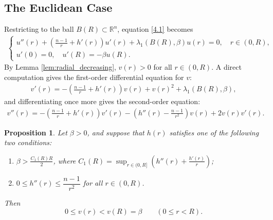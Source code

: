 \documentclass[11pt,leqno]{amsart}
\newtheorem{prop}{Proposition}[section]
\def\R{\mathbb{R}}
\numberwithin{equation}{section}
\begin{document}
\subsection{The Euclidean Case}
Restricting to the ball $B(R)\subset\R^n$, equation \eqref{4.1} becomes
\begin{align}\label{1 dimen eigen R}
    \begin{cases}
   u''(r)+\left(\frac{n-1}{r}+h'(r)\right)u'(r)+\lambda_1(B(R), \beta) u(r)=0, \quad r\in (0, R),\\
   u'(0)=0, \quad u'(R)=-\beta u(R).
\end{cases}
\end{align}
 By Lemma \ref{lem:radial_decreasing}, $v(r) > 0$ for all $r\in (0,R)$. 
A direct computation gives the first-order differential equation for $v$:
\begin{align}\label{v first derivative}
    v'(r) = -\left(\frac{n-1}{r}+h'(r)\right)v(r) + v(r)^{2} + \lambda_1(B(R), \beta),
\end{align}
and differentiating once more gives the second-order equation:
\begin{align}\label{v second derivative}
    v''(r) = -\left(\frac{n-1}{r}+h'(r)\right)v'(r) - \left(h''(r)-\frac{n-1}{r^{2}}\right)v(r) + 2v(r)v'(r).
\end{align}

\begin{prop}\label{prop:Euclidean_v_max}
Let $\beta > 0$, and suppose that $h(r)$ satisfies one of the following two conditions: 
\begin{enumerate}
    \item[\textup{(i)}] $\beta > \frac{C_{1}(R)R}{2}$, where $C_{1}(R)=\sup_{r\in (0,R]} \left(h''(r) + \frac{h'(r)}{r}\right)$;
    \item[\textup{(ii)}] $0\leq h''(r)\leq \dfrac{n-1}{r^2}$ for all $r\in(0,R)$.
\end{enumerate}
Then
\begin{equation}\label{eq:v-Euclidean-bound}
	0\leq v(r)<v(R)=\beta
	\qquad(0\leq r<R).
\end{equation}
\end{prop}
\end{document}
